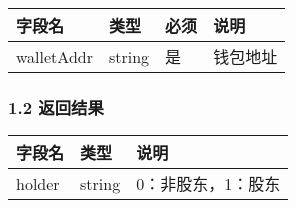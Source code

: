 \documentclass[letterpaper,10pt,english]{sphinxmanual}
\begin{document}


\begin{savenotes}\sphinxattablestart
\centering
\begin{tabulary}{\linewidth}[t]{|T|T|T|T|}
\hline
\sphinxstyletheadfamily 
字段名
&\sphinxstyletheadfamily 
类型
&\sphinxstyletheadfamily 
必须
&\sphinxstyletheadfamily 
说明
\\
\hline
walletAddr
&
string
&
是
&
钱包地址
\\
\hline
\end{tabulary}
\par
\sphinxattableend\end{savenotes}


\subsubsection{1.2 返回结果}
\label{\detokenize{BCBWalletSDK_u63a5_u53e3_u8bf4_u660e:id88}}

\begin{sphinxVerbatim}[commandchars=\\\{\}]
     
\end{sphinxVerbatim}



\begin{savenotes}\sphinxattablestart
\centering
\begin{tabulary}{\linewidth}[t]{|T|T|T|}
\hline
\sphinxstyletheadfamily 
字段名
&\sphinxstyletheadfamily 
类型
&\sphinxstyletheadfamily 
说明
\\
\hline
holder
&
string
&
0：非股东，1：股东
\\
\hline
\end{tabulary}
\par
\sphinxattableend\end{savenotes}


\begin{sphinxVerbatim}[commandchars=\\\{\}]
     
\end{sphinxVerbatim}
\end{document}

